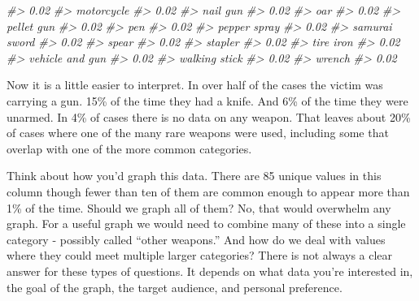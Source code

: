 \documentclass[
]{krantz}
\makeatletter
\newenvironment{Shaded}{\begin{snugshade}}{\end{snugshade}}
\newcommand{\CommentTok}[1]{\textcolor[rgb]{0.37,0.37,0.37}{\textit{#1}}}
\newenvironment{kframe}{%
\medskip{}
\setlength{\fboxsep}{.8em}
 \def\at@end@of@kframe{}%
 \ifinner\ifhmode%
  \def\at@end@of@kframe{\end{minipage}}%
  \begin{minipage}{\columnwidth}%
 \fi\fi%
 \def\FrameCommand##1{\hskip\@totalleftmargin \hskip-\fboxsep
 \colorbox{shadecolor}{##1}\hskip-\fboxsep
     \hskip-\linewidth \hskip-\@totalleftmargin \hskip\columnwidth}%
 \MakeFramed {\advance\hsize-\width
   \@totalleftmargin\z@ \linewidth\hsize
   \@setminipage}}%
 {\par\unskip\endMakeFramed%
 \at@end@of@kframe}
\renewenvironment{Shaded}{\begin{kframe}}{\end{kframe}}
\makeatother
\begin{document}
\begin{Shaded}
\begin{Highlighting}[]
\CommentTok{\#\textgreater{}                             0.02 }
\CommentTok{\#\textgreater{}                       motorcycle }
\CommentTok{\#\textgreater{}                             0.02 }
\CommentTok{\#\textgreater{}                         nail gun }
\CommentTok{\#\textgreater{}                             0.02 }
\CommentTok{\#\textgreater{}                              oar }
\CommentTok{\#\textgreater{}                             0.02 }
\CommentTok{\#\textgreater{}                       pellet gun }
\CommentTok{\#\textgreater{}                             0.02 }
\CommentTok{\#\textgreater{}                              pen }
\CommentTok{\#\textgreater{}                             0.02 }
\CommentTok{\#\textgreater{}                     pepper spray }
\CommentTok{\#\textgreater{}                             0.02 }
\CommentTok{\#\textgreater{}                    samurai sword }
\CommentTok{\#\textgreater{}                             0.02 }
\CommentTok{\#\textgreater{}                            spear }
\CommentTok{\#\textgreater{}                             0.02 }
\CommentTok{\#\textgreater{}                          stapler }
\CommentTok{\#\textgreater{}                             0.02 }
\CommentTok{\#\textgreater{}                        tire iron }
\CommentTok{\#\textgreater{}                             0.02 }
\CommentTok{\#\textgreater{}                  vehicle and gun }
\CommentTok{\#\textgreater{}                             0.02 }
\CommentTok{\#\textgreater{}                    walking stick }
\CommentTok{\#\textgreater{}                             0.02 }
\CommentTok{\#\textgreater{}                           wrench }
\CommentTok{\#\textgreater{}                             0.02}
\end{Highlighting}
\end{Shaded}

Now it is a little easier to interpret. In over half of the
cases the victim was carrying a gun. 15\% of the time they
had a knife. And 6\% of the time they were unarmed. In 4\%
of cases there is no data on any weapon. That leaves about
20\% of cases where one of the many rare weapons were used,
including some that overlap with one of the more common
categories.

Think about how you'd graph this data. There are 85 unique
values in this column though fewer than ten of them are
common enough to appear more than 1\% of the time. Should we
graph all of them? No, that would overwhelm any graph. For a
useful graph we would need to combine many of these into a
single category - possibly called ``other weapons.'' And how
do we deal with values where they could meet multiple larger
categories? There is not always a clear answer for these
types of questions. It depends on what data you're
interested in, the goal of the graph, the target audience,
and personal preference.
\end{document}
